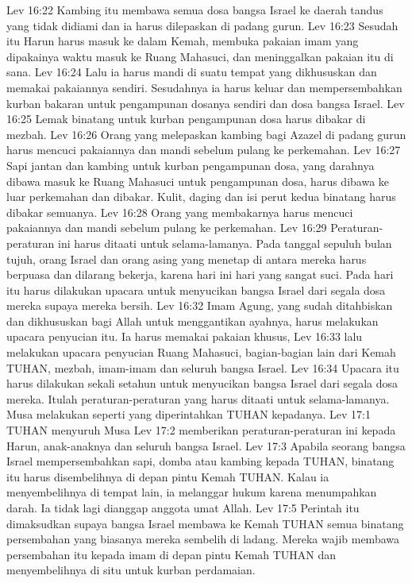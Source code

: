 Lev 16:22  Kambing itu membawa semua dosa bangsa Israel ke daerah tandus yang tidak didiami dan ia harus dilepaskan di padang gurun.
Lev 16:23  Sesudah itu Harun harus masuk ke dalam Kemah, membuka pakaian imam yang dipakainya waktu masuk ke Ruang Mahasuci, dan meninggalkan pakaian itu di sana.
Lev 16:24  Lalu ia harus mandi di suatu tempat yang dikhususkan dan memakai pakaiannya sendiri. Sesudahnya ia harus keluar dan mempersembahkan kurban bakaran untuk pengampunan dosanya sendiri dan dosa bangsa Israel.
Lev 16:25  Lemak binatang untuk kurban pengampunan dosa harus dibakar di mezbah.
Lev 16:26  Orang yang melepaskan kambing bagi Azazel di padang gurun harus mencuci pakaiannya dan mandi sebelum pulang ke perkemahan.
Lev 16:27  Sapi jantan dan kambing untuk kurban pengampunan dosa, yang darahnya dibawa masuk ke Ruang Mahasuci untuk pengampunan dosa, harus dibawa ke luar perkemahan dan dibakar. Kulit, daging dan isi perut kedua binatang harus dibakar semuanya.
Lev 16:28  Orang yang membakarnya harus mencuci pakaiannya dan mandi sebelum pulang ke perkemahan.
Lev 16:29  Peraturan-peraturan ini harus ditaati untuk selama-lamanya. Pada tanggal sepuluh bulan tujuh, orang Israel dan orang asing yang menetap di antara mereka harus berpuasa dan dilarang bekerja, karena hari ini hari yang sangat suci. Pada hari itu harus dilakukan upacara untuk menyucikan bangsa Israel dari segala dosa mereka supaya mereka bersih.
Lev 16:32  Imam Agung, yang sudah ditahbiskan dan dikhususkan bagi Allah untuk menggantikan ayahnya, harus melakukan upacara penyucian itu. Ia harus memakai pakaian khusus,
Lev 16:33  lalu melakukan upacara penyucian Ruang Mahasuci, bagian-bagian lain dari Kemah TUHAN, mezbah, imam-imam dan seluruh bangsa Israel.
Lev 16:34  Upacara itu harus dilakukan sekali setahun untuk menyucikan bangsa Israel dari segala dosa mereka. Itulah peraturan-peraturan yang harus ditaati untuk selama-lamanya. Musa melakukan seperti yang diperintahkan TUHAN kepadanya.
Lev 17:1  TUHAN menyuruh Musa
Lev 17:2  memberikan peraturan-peraturan ini kepada Harun, anak-anaknya dan seluruh bangsa Israel.
Lev 17:3  Apabila seorang bangsa Israel mempersembahkan sapi, domba atau kambing kepada TUHAN, binatang itu harus disembelihnya di depan pintu Kemah TUHAN. Kalau ia menyembelihnya di tempat lain, ia melanggar hukum karena menumpahkan darah. Ia tidak lagi dianggap anggota umat Allah.
Lev 17:5  Perintah itu dimaksudkan supaya bangsa Israel membawa ke Kemah TUHAN semua binatang persembahan yang biasanya mereka sembelih di ladang. Mereka wajib membawa persembahan itu kepada imam di depan pintu Kemah TUHAN dan menyembelihnya di situ untuk kurban perdamaian.
